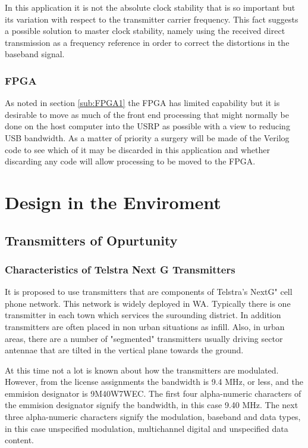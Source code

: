 \documentclass[a4paper]{report}
\numberwithin{equation}{chapter}
\begin{document}
\bigskip

In this application it is not the absolute clock stability that is so important but its variation with respect to the transmitter carrier frequency. This fact suggests a possible solution to master clock stability, namely using the received direct transmission as a frequency reference in order to correct the distortions in the baseband signal.

\subsection{FPGA}

As noted in section \ref{sub:FPGA1} the FPGA has limited capability but it is desirable to move as much of the front end processing that might normally be done on the host computer into the USRP as possible with a view to reducing USB bandwidth. As a matter of priority a surgery will be made of the Verilog code to see which of it may be discarded in this application and whether discarding any code will allow processing to be moved to the FPGA.

\clearpage\setcounter{page}{1}
\chapter[Design in the Enviroment]{Design in the Enviroment}

\section[Transmitters of Opurtunity]{Transmitters of Opurtunity}

\subsection[Characteristics of Telstra Next G Transmitters]{Characteristics of Telstra Next G Transmitters}

It is proposed to use transmitters that are components of Telstra's NextG" cell phone network. This network is widely deployed in WA. Typically there is one transmitter in each town which services the surounding district. In addition transmitters are often placed in non urban situations as infill. Also, in urban areas, there are a number of "segmented" transmitters usually driving sector antennae 
that are tilted in the vertical plane towards the ground.

\bigskip

At this time not a lot is known about how the transmitters are modulated. However, from the license assignments the bandwidth is 9.4 MHz, or less, and the emmision designator is 9M40W7WEC. The first four alpha-numeric characters of the emmision designator signify the bandwidth, in this case 9.40 MHz. The next three alpha-numeric characters signify the modulation, baseband and data types, in this case unspecified modulation, multichannel digital and unspecified data content.
\end{document}
